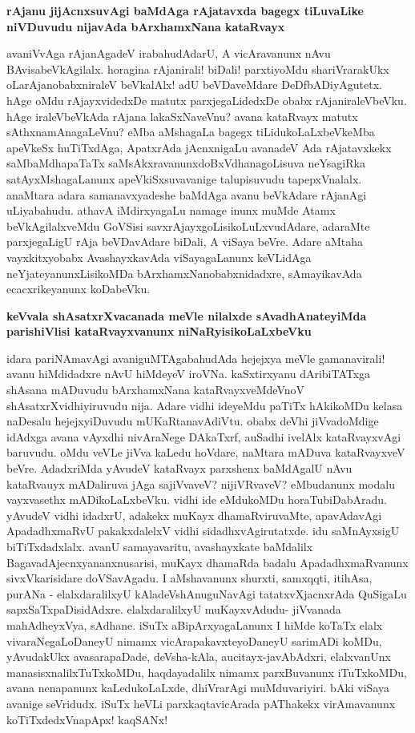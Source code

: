 {\bigskip
\noindent
{\large\bf rAjanu jijAcnxsuvAgi baMdAga rAjatavxda bagegx tiLuvaLike niVDuvudu nijavAda bArxhamxNana kataRvayx}}
\medskip

\noindent
avaniVvAga rAjanAgadeV irabahudAdarU, A vicAravanunx nAvu BAvisa\-beVkAgilalx. hora\-gina rAjanirali! biDali! parxtiyoMdu shariVrarakUkx oLarAjanobabxniraleV beVkalAlx! adU beVDa\-veMdare DeDf\-bADi\-yAgutetx. hAge oMdu rAjayxvidedxDe matutx parxjegaLidedxDe obabx rAjaniraleVbeVku. hAge iraleVbeVkAda rAjana lakaSxNaveVnu? avana kataRvayx matutx sAthxnamAnagaLeVnu? eMba aMshagaLa bagegx tiLidukoLaLx\-beVkeMba apeVkeSx huTiTxdAga, ApatxrAda jAcnxnigaLu avanadeV Ada rAjatavxkekx saMbaMdhapaTaTx saMsAkxravanunx\-doBxVdhanagoLisuva neYsagiRka satAyxMshagaLanunx apeVkiSxsuvavanige talupisuvudu tapepxVnalalx. anaMtara adara samanavxyadeshe baMdAga avanu beVkAdare rAjanAgi uLiyabahudu. athavA iMdirxyagaLu namage inunx muMde Atamx beVkAgilalxveMdu GoVSisi savxrAjayxgoLisikoLuLxvudAdare, adaraMte parxjegaLigU rAja beVDavAdare biDali, A viSaya beVre. Adare aMtaha vayxkitxyobabx AvashayxkavAda viSayagaLanunx keVLidAga neYjateyanunxLisikoMDa bArxhamxNanobabxnidadxre, sAmayikavAda ecacxrikeyanunx koDabeVku.

{\bigskip
\noindent
{\large\bf keVvala shAsatxrXvacanada meVle nilalxde sAvadhAnateyiMda parishiVlisi kataRvayxvanunx niNaRyisi\-koLaLx\-beVku}}\label{page253}
\medskip

\noindent
idara pariNAmavAgi avaniguMTAgabahudAda hejejxya meVle gamanavirali! avanu hiMdi\-dadxre nAvU hiMdeyeV iroVNa. kaSxtirxyanu dAribiTATxga shAsana mADuvudu bArxhamxNana kataRvayx\-veMdeVnoV shAsatxrXvidhiyiruvudu nija. Adare vidhi ideyeMdu paTiTx hAkikoMDu kelasa naDesalu hejejxyiDu\-vudu mUKaRtanavAdiVtu. obabx deVhi jiVvadoMdige idAdxga avana vAyxdhi nivAraNege DAkaTxrf, auSadhi ivelAlx\- kataRvayxvAgi baruvudu. oMdu veVLe jiVva kaLedu hoVdare, naMtara mADuva kataRvayxveV beVre. AdadxriMda yAvudeV kataRvayx parxshenx baMdAgalU nAvu kataRvauyx mADaliruva jAga sajiV\-vaveV? nijiVRvaveV? eMbudanunx modalu vayxvasethx mADikoLaLxbeVku. vidhi ide eMdukoMDu horaTu\-biDa\-bAradu. yAvudeV vidhi idadxrU, adakekx muKayx dhamaRviruvaMte, apavAdavAgi Apadadhx\-maRvU pakakx\-dalelxV vidhi sidadhxvAgirutatxde. idu saMnAyxsigU biTiTxdadxlalx. avanU samayavaritu, avashayxkate baMdalilx\- BagavadAjecnxyananxnusarisi, muKayx dhamaRda badalu ApadadhxmaRvanunx sivxVkarisidare doVSa\-vAgadu. I aMsha\-vanunx shurxti, samxqqti, itihAsa, purANa - elalxdaralilxyU kAladeVshAnuguNavAgi tatatxvXjacnx\-rAda QuSi\-gaLu sapxSaTxpaDisidAdxre. elalxdaralilxyU muKayxvAdudu- jiVvanada mahAdheyxVya, sAdhane. iSuTx aBi\-pArxya\-gaLanunx I hiMde koTaTx elalx vivaraNegaLoDaneyU nimamx vicArapakavxteyoDa\-neyU sari\-mADi\-
koMDu, yAvudakUkx avasarapaDade, deVsha-kAla, aucitayx-javAbAdxri, elalxvanUnx manasisxnalilxTuTxkoMDu,
 haqdayadalilx nimamx parxBuvanunx iTuTxkoMDu, avana nenapanunx kaLedukoLaLxde, dhiVrarAgi muMduvariyiri. bAki viSaya avanige seVridudx. iSuTx heVLi parxkaqtavicArada pAThakekx virAmavanunx koTiTxdedxVnapApx! kaqSANx!

